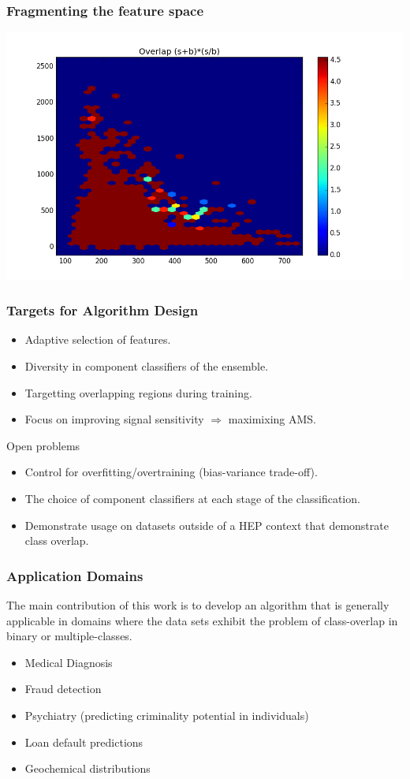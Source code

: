 \documentclass[pdf]{beamer}
\begin{document}
\begin{frame}
\frametitle{Fragmenting the feature space}
\includegraphics[scale=0.4]{overlap.png}
\end{frame}

\begin{frame}
\frametitle{Targets for Algorithm Design}
\begin{itemize}
\item Adaptive selection of features.
\item Diversity in component classifiers of the ensemble. 
\item Targetting overlapping regions during training. 
\item Focus on improving signal sensitivity $\Rightarrow$ maximixing AMS.
\end{itemize}
\end{frame}

\begin{frame}{Open problems}
\begin{itemize}
\item Control for overfitting/overtraining (bias-variance trade-off). 
\item The choice of component classifiers at each stage of the classification.
\item Demonstrate usage on datasets outside of a HEP context that demonstrate class overlap. 
\end{itemize}
\end{frame}

\begin{frame}
\frametitle{Application Domains}
The main contribution of this work is to develop an algorithm that is generally applicable in domains where the data sets exhibit the problem of class-overlap in binary or multiple-classes. \\
\begin{itemize}
\item{Medical Diagnosis}
\item{Fraud detection}
\item{Psychiatry (predicting criminality potential in individuals)}
\item{Loan default predictions}
\item{Geochemical distributions}
\end{itemize}
\end{frame}
\end{document}
